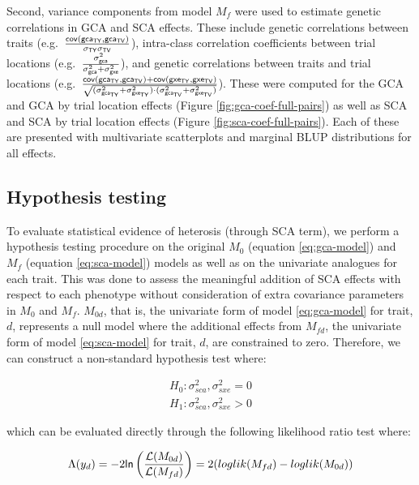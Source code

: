 \begin{refsection}
Second, variance components from model \(M_f\) were used to estimate genetic correlations in GCA and SCA effects. These include genetic correlations between traits (e.g.~\(\frac{\sf cov(gca_{TY},gca_{TV})}{\sigma_{\sf TY}\sigma_{\sf TV}}\)), intra-class correlation coefficients between trial locations (e.g.~\(\frac{\sigma^2_{\sf gca}}{\sigma^2_{\sf gca}+\sigma^2_{\sf gxe}}\)), and genetic correlations between traits and trial locations (e.g.~\(\frac{\sf cov(gca_{TY},gca_{TV})+cov(gxe_{TY},gxe_{TV})}{ \sqrt{(\sigma^2_{\sf gca_{TY}}+\sigma^2_{\sf gxe_{TY}})\cdot(\sigma^2_{\sf gca_{TV}}+\sigma^2_{\sf gxe_{TV}})}}\)). These were computed for the GCA and GCA by trial location effects (Figure \ref{fig:gca-coef-full-pairs}) as well as SCA and SCA by trial location effects (Figure \ref{fig:sca-coef-full-pairs}). Each of these are presented with multivariate scatterplots and marginal BLUP distributions for all effects.

\subsection{Hypothesis testing}\label{hypothesis-testing}

To evaluate statistical evidence of heterosis (through SCA term), we perform a hypothesis testing procedure on the original \(M_0\) (equation \eqref{eq:gca-model}) and \(M_f\) (equation \eqref{eq:sca-model}) models as well as on the univariate analogues for each trait. This was done to assess the meaningful addition of SCA effects with respect to each phenotype without consideration of extra covariance parameters in \(M_0\) and \(M_f\). \(M_{0d}\), that is, the univariate form of model \eqref{eq:gca-model} for trait, \(d\), represents a null model where the additional effects from \(M_{fd}\), the univariate form of model \eqref{eq:sca-model} for trait, \(d\), are constrained to zero. Therefore, we can construct a non-standard hypothesis test where:

\begin{equation}
\begin{split}
H_0: \sigma^2_{sca}, \sigma^2_{sxe} = 0 \\
H_1: \sigma^2_{sca}, \sigma^2_{sxe} > 0 
\end{split}
\label{eq:hypothesis}
\end{equation}

which can be evaluated directly through the following likelihood ratio test where:

\begin{equation}
\Lambda(y_d) = -2 {\sf ln} \left( \frac{\mathcal{L}(M_{0d})}{\mathcal{L}(M_{fd})} \right) = 2 ( loglik(M_{fd}) - loglik(M_{0d}))
  \label{eq:test}
\end{equation}


\end{refsection}
